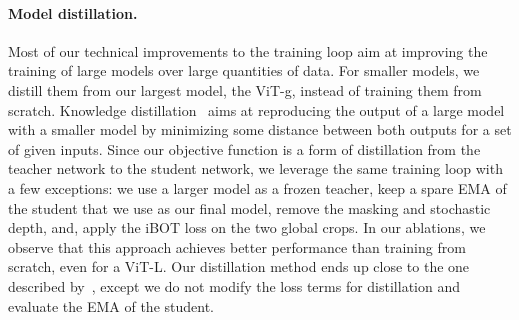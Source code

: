 \paragraph{Model distillation.}
\label{sec:distill}
Most of our technical improvements to the training loop aim at improving the training of large models over large quantities of data.
For smaller models, we distill them from our largest model, the ViT-g, instead of training them from scratch.
Knowledge distillation~\citep{hinton2015distilling} aims at reproducing the output of a large model with a smaller model by minimizing some distance between both outputs for a set of given inputs.
Since our objective function is a form of distillation from the teacher network to the student network, we leverage the same training loop with a few exceptions:
we use a larger model as a frozen teacher, keep a spare EMA of the student that we use as our final model, remove the masking and stochastic depth, and, apply the iBOT loss on the two global crops.
In our ablations, we observe that this approach achieves better performance than training from scratch, even for a ViT-L. 
Our distillation method ends up close to the one described by~\cite{duval2023simple}, except we do not modify the loss terms for distillation and evaluate the EMA of the student.
